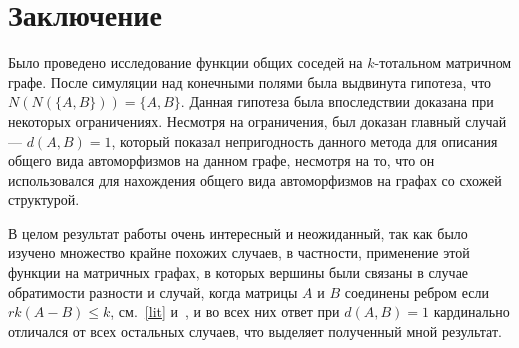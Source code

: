 \documentclass{article}
\begin{document}
\section{Заключение}
Было проведено исследование функции общих соседей на $k$-тотальном матричном графе. После симуляции над конечными полями была выдвинута гипотеза, что $N(N(\{A, B\})) = \{A, B\}$. Данная гипотеза была впоследствии доказана при некоторых ограничениях. Несмотря на ограничения, был доказан главный случай — $d(A, B) = 1$, который показал непригодность данного метода для описания общего вида автоморфизмов на данном графе, несмотря на то, что он использовался для нахождения общего вида автоморфизмов на графах со схожей структурой.

В целом результат работы очень интересный и неожиданный, так как было изучено множество крайне похожих случаев, в частности, применение этой функции на матричных графах, в которых вершины были связаны в случае обратимости разности и случай, когда матрицы $A$ и $B$ соединены ребром если $rk(A - B) \le k$, см.~\ref{lit} и~\cite{art3}, и во всех них ответ при $d(A, B) = 1$ кардинально отличался от всех остальных случаев, что выделяет полученный мной результат.



\end{document}
